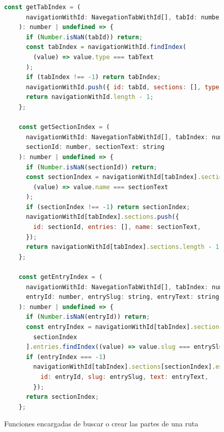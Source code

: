 \begin{figure}
    \begin{lstlisting}[language=Javascript]
    const getTabIndex = (
      navigationWithId: NavegationTabWithId[], tabId: number, tabText: string
    ): number | undefined => {
      if (Number.isNaN(tabId)) return;
      const tabIndex = navigationWithId.findIndex(
        (value) => value.type === tabText
      );
      if (tabIndex !== -1) return tabIndex;
      navigationWithId.push({ id: tabId, sections: [], type: tabText });
      return navigationWithId.length - 1;
    };
    
    const getSectionIndex = (
      navigationWithId: NavegationTabWithId[], tabIndex: number,
      sectionId: number, sectionText: string
    ): number | undefined => {
      if (Number.isNaN(sectionId)) return;
      const sectionIndex = navigationWithId[tabIndex].sections.findIndex(
        (value) => value.name === sectionText
      );
      if (sectionIndex !== -1) return sectionIndex;
      navigationWithId[tabIndex].sections.push({
        id: sectionId, entries: [], name: sectionText,
      });
      return navigationWithId[tabIndex].sections.length - 1;
    };
    
    const getEntryIndex = (
      navigationWithId: NavegationTabWithId[], tabIndex: number, sectionIndex: number,
      entryId: number, entrySlug: string, entryText: string
    ): number | undefined => {
      if (Number.isNaN(entryId)) return;
      const entryIndex = navigationWithId[tabIndex].sections[
        sectionIndex
      ].entries.findIndex((value) => value.slug === entrySlug);
      if (entryIndex === -1)
        navigationWithId[tabIndex].sections[sectionIndex].entries.push({
          id: entryId, slug: entrySlug, text: entryText,
        });
      return sectionIndex;
    };
    \end{lstlisting}
    \caption{Funciones encargadas de buscar o crear las partes de una ruta}
    \label{fig:navCreationFunc}
\end{figure}


